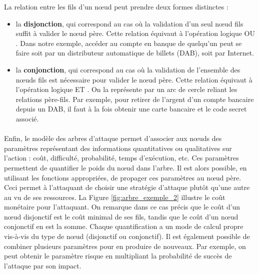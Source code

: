         La relation entre les fils d'un nœud peut prendre deux formes distinctes :
        \begin{itemize}

            \item la {\bf disjonction}, qui correspond au cas où la validation d'un seul nœud fils suffit à valider le nœud père. Cette relation équivaut à l'opération logique \og OU \fg{}. Dans notre exemple, accéder au compte en banque de quelqu'un peut se faire soit par un distributeur automatique de billets (DAB), soit par Internet.

            
            \item la {\bf conjonction}, qui correspond au cas où la validation de l'ensemble des nœuds fils est nécessaire pour valider le nœud père. Cette relation équivaut à l'opération logique \og ET \fg{}. On la représente par un arc de cercle reliant les relations père-fils. Par exemple, pour retirer de l'argent d'un compte bancaire depuis un DAB, il faut à la fois obtenir une carte bancaire et le code secret associé.
        \end{itemize} 
	

	\paragraph{}

        Enfin, le modèle des arbres d'attaque permet d'associer aux nœuds des paramètres représentant des informations quantitatives ou qualitatives sur l'action : coût, difficulté, probabilité, temps d'exécution, etc. Ces paramètres permettent de quantifier le poids du nœud dans l'arbre. Il est alors possible, en utilisant les fonctions appropriées, de propager ces paramètres au nœud père. Ceci permet à l'attaquant de choisir une stratégie d'attaque plutôt qu'une autre au vu de ses ressources. La Figure \ref{fig:arbre_exemple_2} illustre le coût monétaire pour l'attaquant. On remarque dans ce cas précis que le coût d'un nœud disjonctif est le coût minimal de ses fils, tandis que le coût d'un nœud conjonctif en est la somme. Chaque quantification a un mode de calcul propre vis-à-vis du type de nœud (disjonctif ou conjonctif). Il est également possible de combiner plusieurs paramètres pour en produire de nouveaux. Par exemple, on peut obtenir le paramètre \og risque \fg{}  en multipliant la \og probabilité de succès\fg{} de l'attaque par son \og impact\fg{}.


